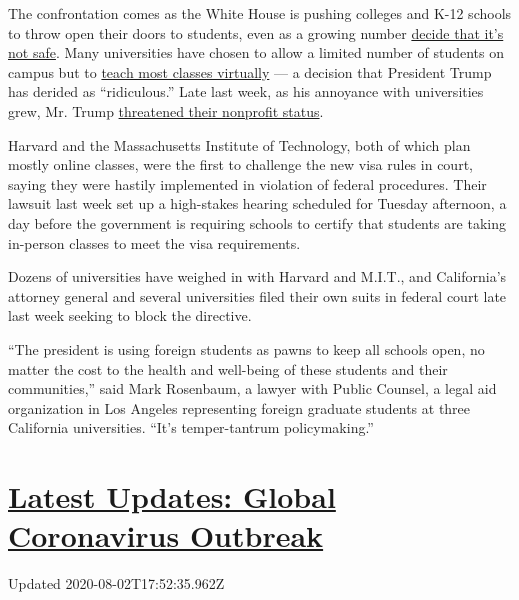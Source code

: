 The confrontation comes as the White House is pushing colleges and K-12
schools to throw open their doors to students, even as a growing number
\href{https://www.nytimes.com/2020/07/13/us/lausd-san-diego-school-reopening.html}{decide
that it's not safe}. Many universities have chosen to allow a limited
number of students on campus but to
\href{https://www.nytimes.com/2020/07/06/us/coronavirus-universities-colleges-reopening.html}{teach
most classes virtually} --- a decision that President Trump has derided
as ``ridiculous.'' Late last week, as his annoyance with universities
grew, Mr. Trump
\href{https://twitter.com/realDonaldTrump/status/1281616586273468416}{threatened
their nonprofit status}.

Harvard and the Massachusetts Institute of Technology, both of which
plan mostly online classes, were the first to challenge the new visa
rules in court, saying they were hastily implemented in violation of
federal procedures. Their lawsuit last week set up a high-stakes hearing
scheduled for Tuesday afternoon, a day before the government is
requiring schools to certify that students are taking in-person classes
to meet the visa requirements.

Dozens of universities have weighed in with Harvard and M.I.T., and
California's attorney general and several universities filed their own
suits in federal court late last week seeking to block the directive.

``The president is using foreign students as pawns to keep all schools
open, no matter the cost to the health and well-being of these students
and their communities,'' said Mark Rosenbaum, a lawyer with Public
Counsel, a legal aid organization in Los Angeles representing foreign
graduate students at three California universities. ``It's
temper-tantrum policymaking.''

\hypertarget{latest-updates-global-coronavirus-outbreak}{%
\section{\texorpdfstring{\href{https://www.nytimes.com/2020/08/01/world/coronavirus-covid-19.html?action=click\&pgtype=Article\&state=default\&region=MAIN_CONTENT_1\&context=storylines_live_updates}{Latest
Updates: Global Coronavirus
Outbreak}}{Latest Updates: Global Coronavirus Outbreak}}\label{latest-updates-global-coronavirus-outbreak}}

Updated 2020-08-02T17:52:35.962Z

